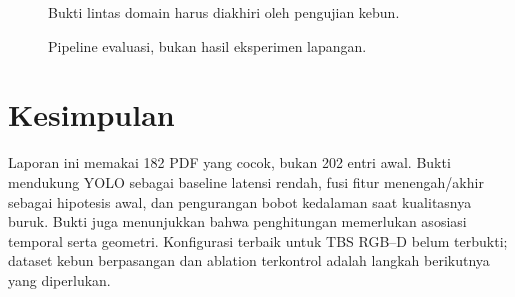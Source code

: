 \begin{figure}[htbp]
\centering
{}
\caption{Bukti lintas domain harus diakhiri oleh pengujian kebun.}
\label{fig:funnel}
\end{figure}

\begin{figure}[htbp]
\centering
{}
\caption{Pipeline evaluasi, bukan hasil eksperimen lapangan.}
\label{fig:pipeline}
\end{figure}

\section{Kesimpulan}

Laporan ini memakai 182 PDF yang cocok, bukan 202 entri awal. Bukti mendukung
YOLO sebagai baseline latensi rendah, fusi fitur menengah/akhir sebagai hipotesis
awal, dan pengurangan bobot kedalaman saat kualitasnya buruk. Bukti juga menunjukkan
bahwa penghitungan memerlukan asosiasi temporal serta geometri. Konfigurasi terbaik
untuk TBS RGB--D belum terbukti; dataset kebun berpasangan dan ablation terkontrol
adalah langkah berikutnya yang diperlukan.
